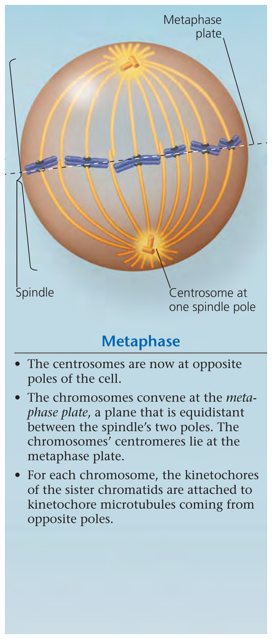 \documentclass[11pt,ignorenonframetext,aspectratio=169]{beamer}
\begin{document}
\begin{frame}{}
\protect\hypertarget{section-10}{}
\begin{columns}[T,onlytextwidth]
  


\begin{center}\includegraphics[width=0.64\linewidth]{../images/mitosis_animal_cell31} \end{center}




\end{columns}
\end{frame}
\end{document}
